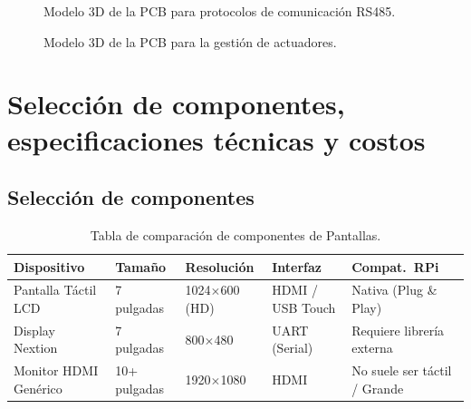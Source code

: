 \documentclass[11pt,tesis,twoside,openright,spanish]{upiiztt}
\begin{document}
\begin{figure}[H]
  \centering
  \caption{Modelo 3D de la PCB para protocolos de comunicación RS485.}
  \label{fig:pcb3d_2}
\end{figure}

\begin{figure}[H]
  \centering
  \caption{Modelo 3D de la PCB para la gestión de actuadores.}
  \label{fig:pcb3d_3}
\end{figure}
\chapter{Selección de componentes, especificaciones técnicas y costos}
\label{ap:componentes_costos}

\section*{Selección de componentes}

\begin{table}[H]
\centering
\caption{Tabla de comparación de componentes de Pantallas.}
\label{tab:comp_pantallas}
\begin{tabular}{lllll}
\toprule
\textbf{Dispositivo} & \textbf{Tamaño} & \textbf{Resolución} & \textbf{Interfaz} & \textbf{Compat.\ RPi} \\
\midrule
Pantalla Táctil LCD  & 7 pulgadas & 1024$\times$600 (HD) & HDMI / USB Touch & Nativa (Plug \& Play) \\
Display Nextion      & 7 pulgadas & 800$\times$480        & UART (Serial)    & Requiere librería externa \\
Monitor HDMI Genérico & 10+ pulgadas & 1920$\times$1080 & HDMI             & No suele ser táctil / Grande \\
\bottomrule
\end{tabular}
\end{table}
\end{document}
